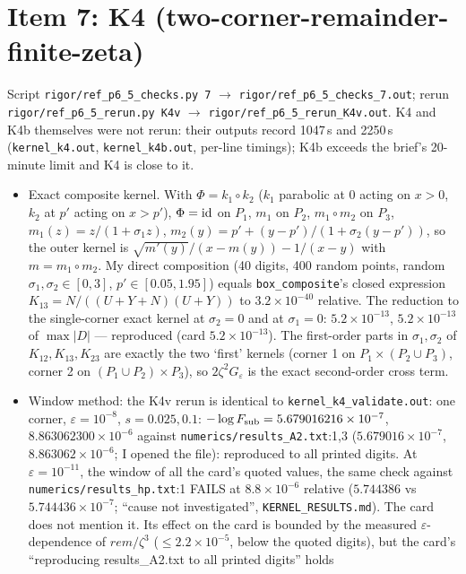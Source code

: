 \documentclass[11pt]{article}
\begin{document}
\section{Item 7: K4 (two-corner-remainder-finite-zeta)}
Script \texttt{rigor/ref\_p6\_5\_checks.py 7} $\to$ \texttt{rigor/ref\_p6\_5\_checks\_7.out}; rerun
\texttt{rigor/ref\_p6\_5\_rerun.py K4v} $\to$ \texttt{rigor/ref\_p6\_5\_rerun\_K4v.out}. K4 and K4b themselves were not rerun:
their outputs record 1047\,s and 2250\,s (\texttt{kernel\_k4.out}, \texttt{kernel\_k4b.out}, per-line timings); K4b exceeds the
brief's 20-minute limit and K4 is close to it.
\begin{itemize}[leftmargin=*]
\item Exact composite kernel. With $\Phi=k_1\circ k_2$ ($k_1$ parabolic at 0 acting on $x>0$, $k_2$ at $p'$ acting on $x>p'$),
$\Phi={\rm id}$ on $P_1$, $m_1$ on $P_2$, $m_1\circ m_2$ on $P_3$, $m_1(z)=z/(1+\sigma_1z)$, $m_2(y)=p'+(y-p')/(1+\sigma_2(y-p'))$,
so the outer kernel is $\sqrt{m'(y)}/(x-m(y))-1/(x-y)$ with $m=m_1\circ m_2$. My direct composition (40 digits, 400 random
points, random $\sigma_1,\sigma_2\in[0,3]$, $p'\in[0.05,1.95]$) equals \texttt{box\_composite}'s closed expression
$K_{13}=N/((U+Y+N)(U+Y))$ to $3.2\times10^{-40}$ relative. The reduction to the single-corner exact kernel at
$\sigma_2=0$ and at $\sigma_1=0$: $5.2\times10^{-13}$, $5.2\times10^{-13}$ of $\max|D|$ --- reproduced (card $5.2\times10^{-13}$).
The first-order parts in $\sigma_1,\sigma_2$ of $K_{12},K_{13},K_{23}$ are exactly the two `first' kernels (corner 1 on
$P_1\times(P_2\cup P_3)$, corner 2 on $(P_1\cup P_2)\times P_3$), so $2\zeta^2G_\varepsilon$ is the exact second-order cross term.
\item Window method: the K4v rerun is identical to \texttt{kernel\_k4\_validate.out}: one corner, $\varepsilon=10^{-8}$,
$s=0.025, 0.1$: $-\log F_{\rm sub}=5.679016216\times10^{-7}$, $8.863062300\times10^{-6}$ against \texttt{numerics/results\_A2.txt}:1,3
($5.679016\times10^{-7}$, $8.863062\times10^{-6}$; I opened the file): reproduced to all printed digits. At $\varepsilon=10^{-11}$, the
window of all the card's quoted values, the same check against \texttt{numerics/results\_hp.txt}:1 FAILS at
$8.8\times10^{-6}$ relative ($5.744386$ vs $5.744436\times10^{-7}$; ``cause not investigated'', \texttt{KERNEL\_RESULTS.md}).
The card does not mention it. Its effect on the card is bounded by the measured $\varepsilon$-dependence of $rem/\zeta^3$
($\le2.2\times10^{-5}$, below the quoted digits), but the card's ``reproducing results\_A2.txt to all printed digits'' holds

\end{itemize}
\end{document}
